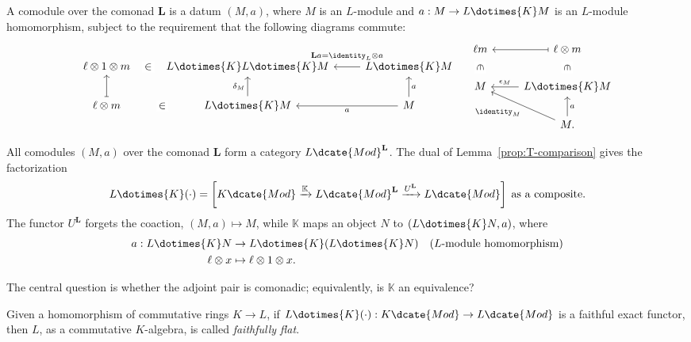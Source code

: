 A comodule over the comonad $\mathbf{L}$ is a datum $(M,a)$, where $M$ is an
$L$-module and $a:M\to L\dotimes{K}M$ is an $L$-module homomorphism, subject
to the requirement that the following diagrams commute:
\[\begin{tikzcd}
	\ell \otimes 1 \otimes m \arrow[phantom, r, "\in" description] & L \dotimes{K} L \dotimes{K} M & L \dotimes{K} M \arrow[l, "{\mathbf{L}a = \identity_L \otimes a}"' inner sep=0.6em] \\
	\ell \otimes m \arrow[phantom, r, "\in" description] \arrow[mapsto, u] & L \dotimes{K} M \arrow[u, "\delta_M"] & M \arrow[l, "a"] \arrow[u, "a"']
\end{tikzcd} \quad \begin{tikzcd}
	\ell m \arrow[phantom, d, "\in" description, sloped] & \ell \otimes m \arrow[phantom, d, "\in" description, sloped] \arrow[mapsto, l] \\
	M & L \dotimes{K} M \arrow[l, "\epsilon_M"'] \\
	& M. \arrow[lu, "\identity_M"] \arrow[u, "a"']
\end{tikzcd}\]

All comodules $(M,a)$ over the comonad $\mathbf{L}$ form a category
$L\dcate{Mod}^{\mathbf{L}}$. The dual of Lemma~\ref{prop:T-comparison}
gives the factorization
\[ L \dotimes{K} (\cdot) = \left[ K\dcate{Mod} \xrightarrow{\mathbb{K}} L\dcate{Mod}^{\mathbf{L}} \xrightarrow{U^{\mathbf{L}}} L\dcate{Mod} \right] \; \text{as a composite}. \]
The functor $U^{\mathbf{L}}$ forgets the coaction, $(M,a)\mapsto M$, while
$\mathbb{K}$ maps an object $N$ to $(L\dotimes{K}N,a)$, where
\begin{equation}\label{eqn:N-comonad-action}
	\begin{aligned}
		a: L \dotimes{K} N & \to L \dotimes{K} (L \dotimes{K} N) \quad \text{($L$-module homomorphism)} \\
		\ell \otimes x & \mapsto \ell \otimes 1 \otimes x.
	\end{aligned}
\end{equation}

The central question is whether the adjoint pair is comonadic; equivalently,
is $\mathbb{K}$ an equivalence?

\begin{definition}
	Given a homomorphism of commutative rings $K\to L$, if
	$L\dotimes{K}(\mathord\cdot):K\dcate{Mod}\to L\dcate{Mod}$ is a
	faithful exact functor, then $L$, as a commutative $K$-algebra, is called
	\emph{faithfully flat}.
\end{definition}

